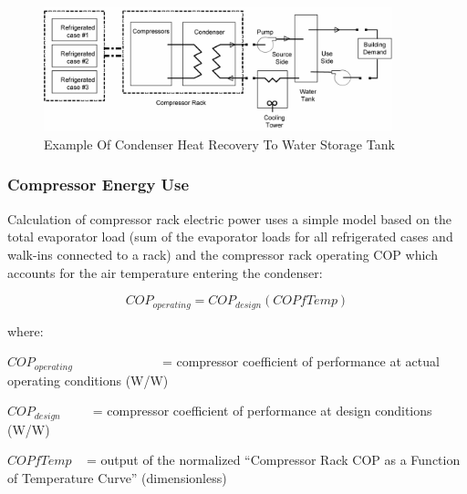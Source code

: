 \begin{figure}[hbtp] %
\centering
\includegraphics[width=0.9\textwidth, height=0.9\textheight, keepaspectratio=true]{media/image6093.png}
\caption{Example Of Condenser Heat Recovery To Water Storage Tank \protect \label{fig:example-of-condenser-heat-recovery-to-water}}
\end{figure}

\subsubsection{Compressor Energy Use}\label{compressor-energy-use}

Calculation of compressor rack electric power uses a simple model based on the total evaporator load (sum of the evaporator loads for all refrigerated cases and walk-ins connected to a rack) and the compressor rack operating COP which accounts for the air temperature entering the condenser:

\begin{equation}
CO{P_{operating}} = CO{P_{design}}\left( {COPfTemp} \right)
\end{equation}

where:

\(CO{P_{operating}}\) ~~~~~~~~~~~ ~ = compressor coefficient of performance at actual operating conditions (W/W)

\(CO{P_{design}}\) ~~ ~ = compressor coefficient of performance at design conditions (W/W)

\(COPfTemp\) ~ = output of the normalized ``Compressor Rack COP as a Function of Temperature Curve'' (dimensionless)

